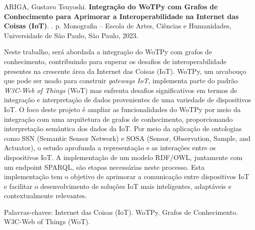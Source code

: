 
\setlength{\absparsep}{18pt} %
\begin{resumo}

% 
%
% 
%
\begin{flushleft}
ARIGA, Gustavo Tsuyoshi. \textbf{Integração do WoTPy com Grafos de Conhecimento para Aprimorar a Interoperabilidade na Internet das Coisas (IoT)}. \imprimirdata. \pageref{LastPage} p. Monografia – Escola de Artes, Ciências e Humanidades, Universidade de São Paulo, São Paulo, 2023. \end{flushleft}


Neste trabalho, será abordada a integração do WoTPy com grafos de conhecimento, contribuindo para superar os desafios de interoperabilidade presentes na crescente área da Internet das Coisas (IoT). WoTPy, um arcabouço que pode ser usado para construir \textit{gateways IoT}, implementa parte do padrão \textit{W3C-Web of Things} (WoT) mas enfrenta desafios significativos em termos de integração e interpretação de dados provenientes de uma variedade de dispositivos IoT. O foco deste projeto é ampliar as funcionalidades do WoTPy por meio da integração com uma arquitetura de grafos de conhecimento, proporcionando  interpretação semântica dos dados da IoT. Por meio da aplicação de ontologias como SSN (Semantic Sensor Network) e SOSA (Sensor, Observation, Sample, and Actuator), o estudo aprofunda a representação e as interações entre os dispositivos IoT. A implementação de um modelo RDF/OWL, juntamente com um endpoint SPARQL, são etapas necessárias neste processo. Esta implementação tem o objetivo de aprimorar a comunicação entre dispositivos IoT e facilitar o desenvolvimento de soluções IoT mais inteligentes, adaptáveis e contextualmente relevantes. 

Palavras-chaves: Internet das Coisas (IoT). WoTPy. Grafos de Conhecimento. W3C-Web of Things (WoT).
\end{resumo}

